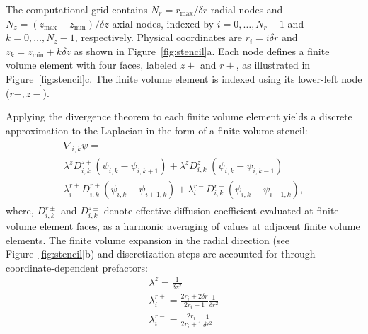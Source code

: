\documentclass[10pt, a4paper, twocolumn]{article}
\begin{document}
The computational grid contains $N_r=r_{\max}/\delta r$ radial nodes and $N_z=(z_{\max}-z_{\min})/\delta z$ axial nodes, indexed by $i=0,\dots,N_r-1$ and $k=0,\dots,N_z-1$, respectively.
Physical coordinates are $r_i=i\delta r$ and $z_k=z_{\min}+k\delta z$ as shown in Figure~\ref{fig:stencil}a.
Each node defines a finite volume element with four faces, labeled $z\pm$ and $r\pm$, as illustrated in Figure~\ref{fig:stencil}c.
The finite volume element is indexed using its lower-left node ($r-, z-$).

Applying the divergence theorem to each finite volume element yields a discrete approximation to the Laplacian in the form of a finite volume stencil:
\begin{eqnarray}
    \begin{aligned} 
        \nabla_{i,k} \psi = 
        \\
        \lambda^{z} D^{z+}_{i,k} (\psi_{i,k} - \psi_{i,k+1}) +  \lambda^{z} D^{z-}_{i,k} (\psi_{i,k} - \psi_{i,k-1})\\
        \lambda^{r+}_{i} D^{r+}_{i,k} (\psi_{i,k} - \psi_{i+1,k}) +  \lambda^{r-}_{i} D^{r-}_{i,k} (\psi_{i,k} - \psi_{i-1,k}),
    \end{aligned}
    \label{eq:FV_divergence}
\end{eqnarray}
where, $D^{r\pm}_{i,k}$ and $D^{z\pm}_{i,k}$ denote effective diffusion coefficient evaluated at finite volume element faces, as a harmonic averaging of values at adjacent finite volume elements. 
The finite volume expansion in the radial direction (see Figure~\ref{fig:stencil}b) and discretization steps are accounted for through coordinate-dependent prefactors:
\begin{eqnarray}
    \lambda^{z} = \frac{1}{\delta z^2}\\
    \lambda^{r+}_{i} = \frac{2 r_i + 2 \delta r}{2 r_i + 1} \frac {1}{\delta r^2}\\
    \lambda^{r-}_{i} = \frac{2 r_i}{2 r_i + 1} \frac {1}{\delta r^2}
\end{eqnarray}
\end{document}
